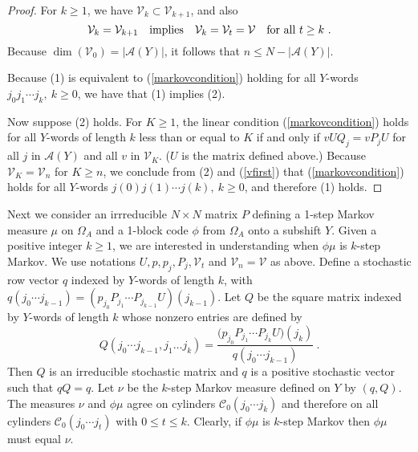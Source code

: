 \documentclass{kepart2010}
\theoremstyle{plain}
\theoremstyle{definition}
\theoremstyle{remark}
\theoremstyle{definition}
\numberwithin{equation}{section}
\begin{document}
\begin{proof}
For $k\geq 1$, we have $\mathcal V_k \subset \mathcal V_{k+1}$,
and also
\begin{equation}
\mathcal V_k = \mathcal V_{k+1} \quad\text{implies}\quad \mathcal
V_k = \mathcal V_{t} =\mathcal V
\ \ \ \textnormal{for all }t\geq k \ .
\end{equation}
Because $\dim (\mathcal V_0) = |\mathcal A(Y)|$,
it follows  that $n\leq   N - |\mathcal A(Y)|$.

Because (1) is equivalent to
(\ref{markovcondition})  holding for all $Y$-words
$j_0j_1\cdots j_k, \ k \geq 0$, we have that (1) implies (2).

Now suppose (2) holds. For $K\geq 1$, the linear condition
(\ref{markovcondition})  holds for all $Y$-words of length $k$ less
than or equal to $K$ if and only if $vUQ_j = vP_jU$ for all $j$ in
$\mathcal A(Y)$ and all $v$ in $\mathcal V_K$.
($U$ is the matrix defined above.)
 Because ${{\mathcal V}}_K={{\mathcal V}}_n$ for $K\geq n$,
  we conclude
from (2) {}{and (\ref{vfirst})}
 that (\ref{markovcondition}) holds for all
 $Y$-words
$j(0)j(1)\cdots j(k),\ k \geq 0$, and therefore (1) holds.
\end{proof}

{}{Next we consider an irrreducible $N\times N$ matrix $P$ defining
a 1-step Markov measure $\mu$ on $\Omega_A$ and a 1-block code
$\phi$ from $\Omega_A$ onto a subshift $Y$. Given a positive integer
$k\geq 1$, we are interested in understanding when $\phi \mu$ is
$k$-step Markov. We use notations $U,p,p_j,P_j, \mathcal V_t $ and
$\mathcal V_n = \mathcal V$ as above. Define a stochastic row vector
$q$ indexed by $Y$-words of length $k$, with $q(j_0\cdots j_{k-1}) =
(p_{j_0} P_{j_1}\cdots P_{j_{k-1}}U)(j_{k-1}). $ Let $Q$ be the
square  matrix indexed by $Y$-words of length $k$ whose nonzero
entries are defined by
\[
Q(j_0\cdots j_{k-1},j_1\dots j_k)
= \frac
{\Big( p_{j_0}P_{j_1}\cdots P_{j_k}U\Big) (j_k)}
{q(j_0\cdots j_{k-1})} \ .
\]
Then $Q$ is an irreducible stochastic matrix and $q$ is a positive
stochastic vector such that $qQ=q$. Let $\nu$ be the $k$-step Markov
measure defined on $Y$ by $(q,Q)$. The measures $\nu$ and $\phi \mu$
agree on cylinders ${{\mathcal C}}_0 (j_0\cdots j_k)$ and therefore on all
cylinders ${{\mathcal C}}_0 (j_0 \cdots j_t)$ with $0\leq t \leq k$. Clearly,
if $\phi \mu$ is $k$-step Markov then $\phi \mu$ must equal $\nu$. }
\end{document}

